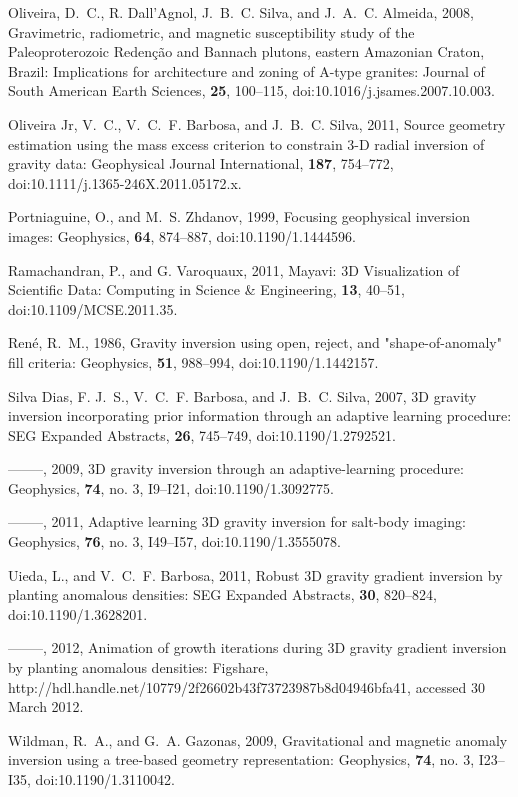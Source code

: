 \documentclass{segabs}
\begin{document}
\begin{thebibliography}{}
Oliveira, D.~C., R. Dall'Agnol, J.~B.~C. Silva, and J.~A.~C. Almeida,  2008,
  {Gravimetric, radiometric, and magnetic susceptibility study of the
  Paleoproterozoic Reden\c{c}\~{a}o and Bannach plutons, eastern Amazonian
  Craton, Brazil: Implications for architecture and zoning of A-type granites}:
  Journal of South American Earth Sciences, {\bf 25}, 100--115,
  doi:10.1016/j.jsames.2007.10.003.

{Oliveira Jr}, V.~C., V.~C.~F. Barbosa, and J.~B.~C. Silva,  2011, {Source
  geometry estimation using the mass excess criterion to constrain 3-D radial
  inversion of gravity data}: Geophysical Journal International, {\bf 187},
  754--772, doi:10.1111/j.1365-246X.2011.05172.x.

Portniaguine, O., and M.~S. Zhdanov,  1999, {Focusing geophysical inversion
  images}: Geophysics, {\bf 64}, 874--887, doi:10.1190/1.1444596.

Ramachandran, P., and G. Varoquaux,  2011, {Mayavi: 3D Visualization of
  Scientific Data}: Computing in Science \& Engineering, {\bf 13}, 40--51,
  doi:10.1109/MCSE.2011.35.

Ren\'{e}, R.~M.,  1986, {Gravity inversion using open, reject, and
  "shape-of-anomaly" fill criteria}: Geophysics, {\bf 51}, 988--994,
  doi:10.1190/1.1442157.

{Silva Dias}, F. J.~S., V.~C.~F. Barbosa, and J.~B.~C. Silva,  2007, {3D
  gravity inversion incorporating prior information through an adaptive
  learning procedure}: SEG Expanded Abstracts, {\bf 26}, 745--749,
  doi:10.1190/1.2792521.

--------, 2009, {3D gravity inversion through an adaptive-learning procedure}:
  Geophysics, {\bf 74}, no. 3, I9--I21, doi:10.1190/1.3092775.

--------, 2011, {Adaptive learning 3D gravity inversion for salt-body imaging}:
  Geophysics, {\bf 76}, no. 3, I49--I57, doi:10.1190/1.3555078.

Uieda, L., and V.~C.~F. Barbosa,  2011, {Robust 3D gravity gradient inversion
  by planting anomalous densities}: SEG Expanded Abstracts, {\bf 30}, 820--824,
  doi:10.1190/1.3628201.

--------, 2012, {Animation of growth iterations during 3D gravity gradient
  inversion by planting anomalous densities}: Figshare,
  http://hdl.handle.net/10779/2f26602b43f73723987b8d04946bfa41,
  accessed 30 March 2012.

Wildman, R.~A., and G.~A. Gazonas,  2009, {Gravitational and magnetic anomaly
  inversion using a tree-based geometry representation}: Geophysics, {\bf 74},
  no. 3, I23--I35, doi:10.1190/1.3110042.

\end{thebibliography}
\end{document}
